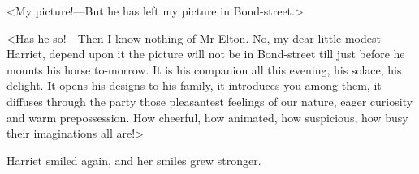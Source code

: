 <My picture!—But he has left my picture in Bond-street.>

<Has he so!—Then I know nothing of Mr Elton. No, my dear little modest Harriet, depend upon it the picture will not be in Bond-street till just before he mounts his horse to-morrow. It is his companion all this evening, his solace, his delight. It opens his designs to his family, it introduces you among them, it diffuses through the party those pleasantest feelings of our nature, eager curiosity and warm prepossession. How cheerful, how animated, how suspicious, how busy their imaginations all are!>

Harriet smiled again, and her smiles grew stronger.